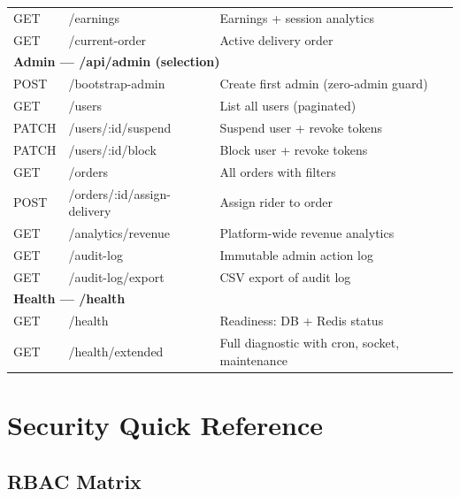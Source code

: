 \documentclass[11pt,a4paper,twoside]{book}
\begin{document}
\begin{center}
\begin{longtable}{p{1.5cm}p{5cm}p{6cm}}
GET  & /earnings               & Earnings + session analytics \\
\rowcolor{rowalt}GET  & /current-order         & Active delivery order \\
\midrule
\multicolumn{3}{l}{\textbf{Admin — /api/admin (selection)}} \\
\midrule
POST & /bootstrap-admin        & Create first admin (zero-admin guard) \\
\rowcolor{rowalt}GET  & /users                  & List all users (paginated) \\
PATCH & /users/:id/suspend     & Suspend user + revoke tokens \\
\rowcolor{rowalt}PATCH & /users/:id/block       & Block user + revoke tokens \\
GET  & /orders                 & All orders with filters \\
\rowcolor{rowalt}POST & /orders/:id/assign-delivery & Assign rider to order \\
GET  & /analytics/revenue      & Platform-wide revenue analytics \\
\rowcolor{rowalt}GET  & /audit-log              & Immutable admin action log \\
GET  & /audit-log/export       & CSV export of audit log \\
\midrule
\multicolumn{3}{l}{\textbf{Health — /health}} \\
\midrule
GET  & /health                 & Readiness: DB + Redis status \\
\rowcolor{rowalt}GET  & /health/extended        & Full diagnostic with cron, socket, maintenance \\
\bottomrule
\end{longtable}
\end{center}

\chapter{Security Quick Reference}

\section{RBAC Matrix}
\end{document}
